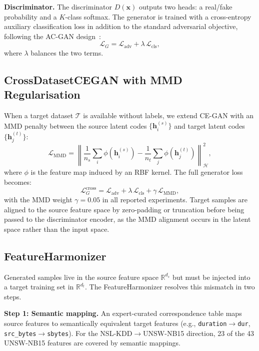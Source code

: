 \documentclass[conference]{IEEEtran}
\begin{document}
\textbf{Discriminator.}
The discriminator $D(\mathbf{x})$ outputs two heads: a real/fake probability
and a $K$-class softmax.
The generator is trained with a cross-entropy auxiliary classification
loss in addition to the standard adversarial objective, following the
AC-GAN design~\cite{odena2017conditional}:
\begin{equation}
  \mathcal{L}_{G} = \mathcal{L}_{\text{adv}} + \lambda\,\mathcal{L}_{\text{cls}},
\end{equation}
where $\lambda$ balances the two terms.

\subsection{CrossDatasetCEGAN with MMD Regularisation}

When a target dataset $\mathcal{T}$ is available without labels, we extend
CE-GAN with an MMD penalty between the source latent codes
$\{\mathbf{h}^{(s)}_i\}$ and target latent codes $\{\mathbf{h}^{(t)}_j\}$:
\begin{equation}
  \mathcal{L}_{\text{MMD}} =
    \left\|\frac{1}{n_s}\sum_i\phi(\mathbf{h}^{(s)}_i)
         - \frac{1}{n_t}\sum_j\phi(\mathbf{h}^{(t)}_j)\right\|_{\mathcal{H}}^2,
\end{equation}
where $\phi$ is the feature map induced by an RBF kernel.
The full generator loss becomes:
\begin{equation}
  \mathcal{L}_{G}^{\text{cross}} =
    \mathcal{L}_{\text{adv}} + \lambda\,\mathcal{L}_{\text{cls}}
    + \gamma\,\mathcal{L}_{\text{MMD}},
\end{equation}
with the MMD weight $\gamma = 0.05$ in all reported experiments.
Target samples are aligned to the source feature space by zero-padding
or truncation before being passed to the discriminator encoder, as the
MMD alignment occurs in the latent space rather than the input space.

\subsection{FeatureHarmonizer}

Generated samples live in the source feature space $\mathbb{R}^{d_s}$
but must be injected into a target training set in $\mathbb{R}^{d_t}$.
The FeatureHarmonizer resolves this mismatch in two steps.

\textbf{Step 1: Semantic mapping.}
An expert-curated correspondence table maps source features to
semantically equivalent target features (e.g.,
\texttt{duration}$\to$\texttt{dur},
\texttt{src\_bytes}$\to$\texttt{sbytes}).
For the NSL-KDD$\to$UNSW-NB15 direction, 23 of the 43 UNSW-NB15
features are covered by semantic mappings.
\end{document}
